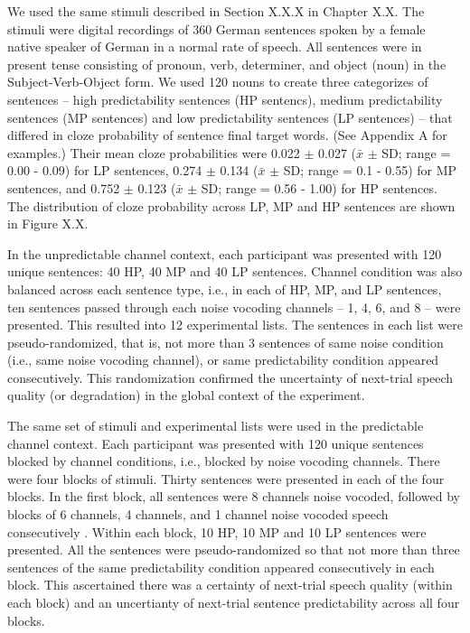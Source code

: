 \documentclass[a4paper, nobind]{templates/ociamthesis}
\begin{document}
We used the same stimuli described in Section X.X.X in Chapter X.X.
The stimuli were digital recordings of 360 German sentences spoken by a female native speaker of German in a normal rate of speech.
All sentences were in present tense consisting of pronoun, verb, determiner, and object (noun) in the Subject-Verb-Object form.
We used 120 nouns to create three categorizes of sentences -- high predictability sentences (HP sentencs), medium predictability sentences (MP sentences) and low predictability sentences (LP sentences) -- that differed in cloze probability of sentence final target words.
(See Appendix A for examples.)
Their mean cloze probabilities were 0.022 \(\pm\) 0.027 (\(\bar{x}\) \(\pm\) SD; range = 0.00 - 0.09) for LP sentences, 0.274 \(\pm\) 0.134 (\(\bar{x}\) \(\pm\) SD; range = 0.1 - 0.55) for MP sentences, and 0.752 \(\pm\) 0.123 (\(\bar{x}\) \(\pm\) SD; range = 0.56 - 1.00) for HP sentences.
The distribution of cloze probability across LP, MP and HP sentences are shown in Figure X.X.

In the unpredictable channel context, each participant was presented with 120 unique sentences: 40 HP, 40 MP and 40 LP sentences. Channel condition was also balanced across each sentence type, i.e., in each of HP, MP, and LP sentences, ten sentences passed through each noise vocoding channels -- 1, 4, 6, and 8 -- were presented.
This resulted into 12 experimental lists.
The sentences in each list were pseudo-randomized, that is, not more than 3 sentences of same noise condition (i.e., same noise vocoding channel), or same predictability condition appeared consecutively.
This randomization confirmed the uncertainty of next-trial speech quality (or degradation) in the global context of the experiment.

The same set of stimuli and experimental lists were used in the predictable channel context.
Each participant was presented with 120 unique sentences blocked by channel conditions, i.e., blocked by noise vocoding channels.
There were four blocks of stimuli.
Thirty sentences were presented in each of the four blocks.
In the first block, all sentences were 8 channels noise vocoded, followed by blocks of 6 channels, 4 channels, and 1 channel noise vocoded speech consecutively \autocite{Sheldon2008a}.
Within each block, 10 HP, 10 MP and 10 LP sentences were presented.
All the sentences were pseudo-randomized so that not more than three sentences of the same predictability condition appeared consecutively in each block.
This ascertained there was a certainty of next-trial speech quality (within each block) and an uncertianty of next-trial sentence predictability across all four blocks.
\end{document}
